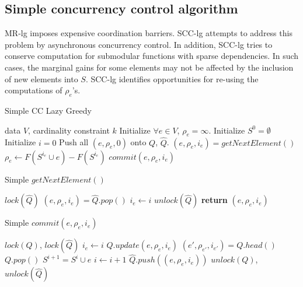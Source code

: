 \documentclass{article}
\newcommand{\mrlz}{MR-lg}
\newcommand{\scclz}{SCC-lg}
\begin{document}
\subsection{Simple concurrency control algorithm}
\mrlz{} imposes expensive coordination barriers.
\scclz{} attempts to address this problem by asynchronous concurrency control.
In addition, \scclz{} tries to conserve computation for submodular functions with sparse dependencies.
In such cases, the marginal gains for some elements may not be affected by the inclusion of new elements into $S$.
\scclz{} identifies opportunities for re-using the computations of $\rho_e$'s.
\begin{algorithm}[tb]
  \caption{Simple CC Lazy Greedy}
  \label{alg:scclz}
\begin{algorithmic}[1]
   data $V$, cardinality constraint $k$
  \STATE Initialize $\forall e \in V$, $\rho_e = \infty$.
  \STATE Initialize $S^0 = \emptyset$
  \STATE Initialize $i = 0$
  \STATE Push all $(e, \rho_e, 0)$ onto $Q$, $\widehat{Q}$.
      \STATE $(e, \rho_e, i_e) = getNextElement()$
        \STATE $\rho_e     \leftarrow F(S^{i_e} \cup e) - F(S^{i_e})$
      \ENDIF
      \STATE $commit(e, \rho_e, i_e)$
    \ENDWHILE
  \ENDFOR
\end{algorithmic}
\end{algorithm}

\begin{algorithm}[tb]
  \caption{Simple $getNextElement()$}
  \label{alg:scclz:getnext}
\begin{algorithmic}
  \STATE $lock(\widehat{Q})$
  \STATE $(e, \rho_e, i_e) = \widehat{Q}.pop()$
  \STATE $i_e \leftarrow i$
  \STATE $unlock(\widehat{Q})$
  \STATE \textbf{return} $(e, \rho_e, i_e)$
\end{algorithmic}
\end{algorithm}


\begin{algorithm}[tb]
  \caption{Simple $commit(e, \rho_e, i_e)$}
  \label{alg:scclz:commit}
\begin{algorithmic}
  \STATE $lock(Q)$, $lock(\widehat{Q})$
    \STATE $i_e \leftarrow i$
  \ENDIF
  \STATE $Q.update(e, \rho_e, i_e)$
  \STATE $(e', \rho_{e'}, i_{e'}) = Q.head()$
    \STATE $Q.pop()$
    \STATE $S^{i+1} = S^i \cup e$
    \STATE $i \leftarrow i + 1$
  \ELSE
    \STATE $\widehat{Q}.push((e, \rho_e, i_e))$
  \ENDIF
  \STATE $unlock(Q)$, $unlock(\widehat{Q})$
\end{algorithmic}
\end{algorithm}
\end{document}
